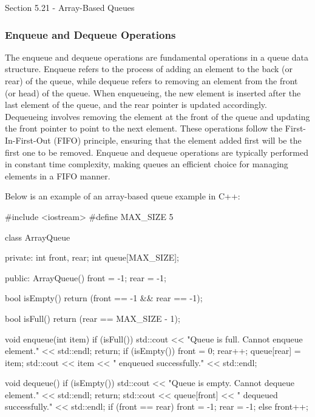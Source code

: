 \begin{notes}{Section 5.21 - Array-Based Queues}
    \subsubsection*{Enqueue and Dequeue Operations}
    
    The enqueue and dequeue operations are fundamental operations in a queue data structure. Enqueue refers to the process of adding an element to the back (or rear) of the queue, while dequeue refers to removing an element from the front (or head) of the queue. When enqueueing, the new element is inserted after the last element of the queue, and the rear pointer is updated accordingly. Dequeueing involves 
    removing the element at the front of the queue and updating the front pointer to point to the next element. These operations follow the First-In-First-Out (FIFO) principle, ensuring that the element added first will be the first one to be removed. Enqueue and dequeue operations are typically performed in constant time complexity, making queues an efficient choice for managing elements in a FIFO manner.
    
    \begin{highlight}
        Below is an example of an array-based queue example in C++:
    
    \begin{code}[C++]
    #include <iostream>
    #define MAX_SIZE 5
    
    class ArrayQueue {
    private:
        int front, rear;
        int queue[MAX_SIZE];
    
    public:
        ArrayQueue() {
            front = -1;
            rear = -1;
        }
    
        bool isEmpty() {
            return (front == -1 && rear == -1);
        }
    
        bool isFull() {
            return (rear == MAX_SIZE - 1);
        }
    
        void enqueue(int item) {
            if (isFull()) {
                std::cout << "Queue is full. Cannot enqueue element." << std::endl;
                return;
            }
            if (isEmpty()) {
                front = 0;
            }
            rear++;
            queue[rear] = item;
            std::cout << item << " enqueued successfully." << std::endl;
        }
    
        void dequeue() {
            if (isEmpty()) {
                std::cout << "Queue is empty. Cannot dequeue element." << std::endl;
                return;
            }
            std::cout << queue[front] << " dequeued successfully." << std::endl;
            if (front == rear) {
                front = -1;
                rear = -1;
            } else {
                front++;
            }
        }
    
}
\end{code}
\end{highlight}
\end{notes}
